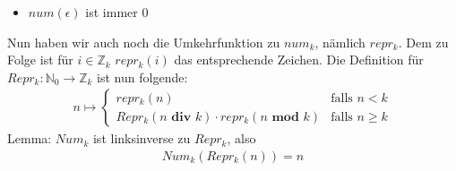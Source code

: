 \documentclass[12pt]{article}
\begin{document}
\begin{flushleft}
\begin{itemize}
        \item $num(\epsilon)$ ist immer $0$
    \end{itemize}
    Nun haben wir auch noch die Umkehrfunktion zu $num_k$, nämlich $repr_k$. Dem zu Folge ist für $i\in \mathbb{Z}_k$ $repr_k(i)$ das entsprechende Zeichen.
    Die Definition für $Repr_k: \mathbb{N}_0 \rightarrow \mathbb{Z}_k$ ist nun folgende:
    \begin{align*}
        n \mapsto \begin{cases}
            repr_k(n) & \text{falls } n < k \\
            Repr_k(n \textbf{ div } k) \cdot repr_k(n \textbf{ mod } k) & \text{falls } n \geq k
        \end{cases}
    \end{align*}
    Lemma: $Num_k$ ist linksinverse zu $Repr_k$, also
    \begin{align*}
        Num_k(Repr_k(n)) = n
    \end{align*}


\end{flushleft}
\end{document}
